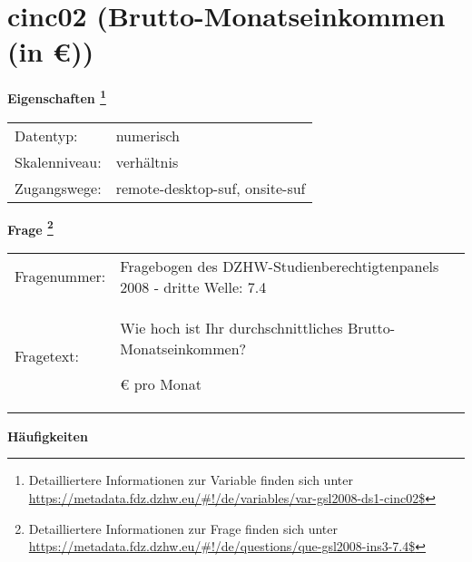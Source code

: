 
    \setcounter{footnote}{0}

    \vspace*{-1.8cm}
	\section{cinc02 (Brutto-Monatseinkommen (in €))}
	\label{section:cinc02}



    \vspace*{0.5cm}
    \noindent\textbf{Eigenschaften
	\footnote{Detailliertere Informationen zur Variable finden sich unter
		\url{https://metadata.fdz.dzhw.eu/\#!/de/variables/var-gsl2008-ds1-cinc02$}}}\\
	\begin{tabularx}{\hsize}{@{}lX}
	Datentyp: & numerisch \\
	Skalenniveau: & verhältnis \\
	Zugangswege: &
	  remote-desktop-suf, 
	  onsite-suf
 \\
    \end{tabularx}



				\vspace*{0.5cm}
                \noindent\textbf{Frage
	                \footnote{Detailliertere Informationen zur Frage finden sich unter
		              \url{https://metadata.fdz.dzhw.eu/\#!/de/questions/que-gsl2008-ins3-7.4$}}}\\
				\begin{tabularx}{\hsize}{@{}lX}
					Fragenummer: &
					  Fragebogen des DZHW-Studienberechtigtenpanels 2008 - dritte Welle:
					  7.4
 \\
					Fragetext: & Wie hoch ist Ihr durchschnittliches Brutto-Monatseinkommen?\par  € pro Monat \\
				\end{tabularx}





        		\vspace*{0.5cm}
                \noindent\textbf{Häufigkeiten}

